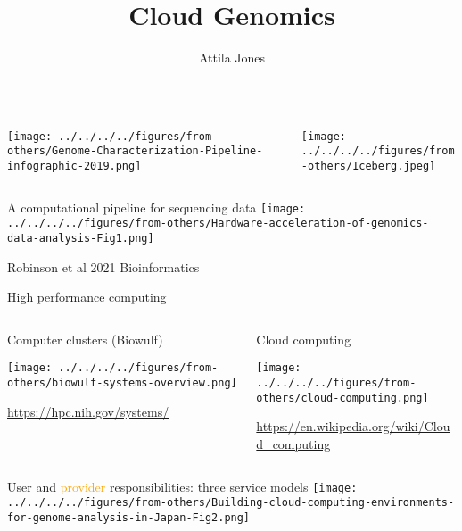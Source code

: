\documentclass[aspectratio=169]{beamer}
\title{Cloud Genomics}
\subtitle{}
\author{Attila Jones}
\date{}
\begin{document}
\titlepage

\begin{frame}[plain]
\begin{columns}[t]
\begin{column}{0.5\textwidth}
\begin{center}
\texttt{[image: ../../../../figures/from-others/Genome-Characterization-Pipeline-infographic-2019.png]}
\end{center}
\end{column}

\begin{column}{0.5\textwidth}
\begin{center}

\texttt{[image: ../../../../figures/from-others/Iceberg.jpeg]}
\end{center}
\end{column}
\end{columns}
\end{frame}

\begin{frame}{A computational pipeline for sequencing data}
\texttt{[image: ../../../../figures/from-others/Hardware-acceleration-of-genomics-data-analysis-Fig1.png]}

{\tiny Robinson et al 2021 Bioinformatics}
\end{frame}

\begin{frame}{High performance computing}
\begin{columns}[t]
\begin{column}{0.5\textwidth}
  Computer clusters (Biowulf)

\texttt{[image: ../../../../figures/from-others/biowulf-systems-overview.png]}

{\tiny \url{https://hpc.nih.gov/systems/}}
\end{column}

\begin{column}{0.5\textwidth}
  Cloud computing

\texttt{[image: ../../../../figures/from-others/cloud-computing.png]}

{\tiny \url{https://en.wikipedia.org/wiki/Cloud_computing}}
\end{column}
\end{columns}
\end{frame}

\begin{frame}{\textcolor{BlueGreen}{User} and \textcolor{orange}{provider}
  responsibilities: three service models}
\texttt{[image: ../../../../figures/from-others/Building-cloud-computing-environments-for-genome-analysis-in-Japan-Fig2.png]}
\end{frame}
\end{document}
